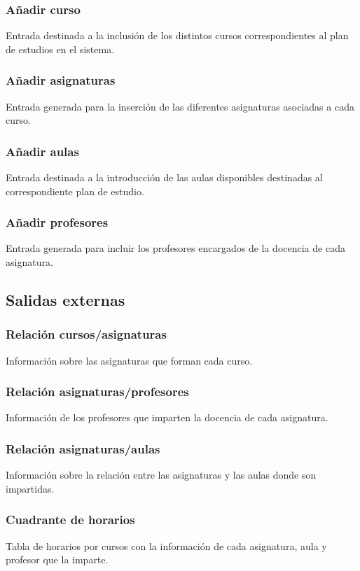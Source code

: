 \documentclass[11pt,a4paper,spanish,twoside]{book}
\begin{document}
\subsubsection{Añadir curso}
Entrada destinada a la inclusión de los distintos cursos correspondientes al
plan de estudios en el sistema.

\subsubsection{Añadir asignaturas}
Entrada generada para la inserción de las diferentes asignaturas asociadas a
cada curso.

\subsubsection{Añadir aulas}
Entrada destinada a la introducción de las aulas disponibles destinadas al
correspondiente plan de estudio.

\subsubsection{Añadir profesores}
Entrada generada para incluir los profesores encargados de la docencia de
cada asignatura.

\subsection{Salidas externas}
\subsubsection{Relación cursos/asignaturas}
Información sobre las asignaturas que forman cada curso.

\subsubsection{Relación asignaturas/profesores}
Información de los profesores que imparten la docencia de cada asignatura.

\subsubsection{Relación asignaturas/aulas}
Información sobre la relación entre las asignaturas y las aulas donde son
impartidas. 

\subsubsection{Cuadrante de horarios}
Tabla de horarios por cursos con la información de cada asignatura, aula y
profesor que la imparte.
\end{document}
